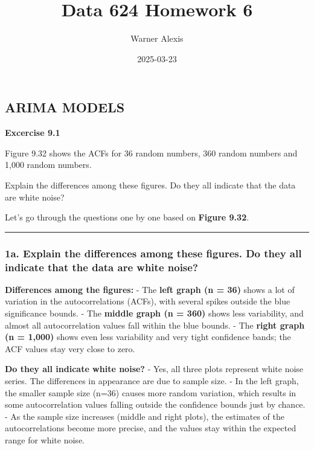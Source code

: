 \documentclass[
]{article}
\title{Data 624 Homework 6}
\author{Warner Alexis}
\date{2025-03-23}
\begin{document}
\maketitle

\hypertarget{arima-models}{%
\subsection{ARIMA MODELS}\label{arima-models}}

\textbf{Excercise 9.1}

Figure 9.32 shows the ACFs for 36 random numbers, 360 random numbers and
1,000 random numbers.

Explain the differences among these figures. Do they all indicate that
the data are white noise?

Let's go through the questions one by one based on \textbf{Figure 9.32}.

\begin{center}\rule{0.5\linewidth}{0.5pt}\end{center}

\hypertarget{a.-explain-the-differences-among-these-figures.-do-they-all-indicate-that-the-data-are-white-noise}{%
\subsubsection{\texorpdfstring{\textbf{1a. Explain the differences among
these figures. Do they all indicate that the data are white
noise?}}{1a. Explain the differences among these figures. Do they all indicate that the data are white noise?}}\label{a.-explain-the-differences-among-these-figures.-do-they-all-indicate-that-the-data-are-white-noise}}

\textbf{Differences among the figures:} - The \textbf{left graph (n =
36)} shows a lot of variation in the autocorrelations (ACFs), with
several spikes outside the blue significance bounds. - The
\textbf{middle graph (n = 360)} shows less variability, and almost all
autocorrelation values fall within the blue bounds. - The \textbf{right
graph (n = 1,000)} shows even less variability and very tight confidence
bands; the ACF values stay very close to zero.

\textbf{Do they all indicate white noise?} - Yes, all three plots
represent white noise series. The differences in appearance are due to
sample size. - In the left graph, the smaller sample size (n=36) causes
more random variation, which results in some autocorrelation values
falling outside the confidence bounds just by chance. - As the sample
size increases (middle and right plots), the estimates of the
autocorrelations become more precise, and the values stay within the
expected range for white noise.
\end{document}
